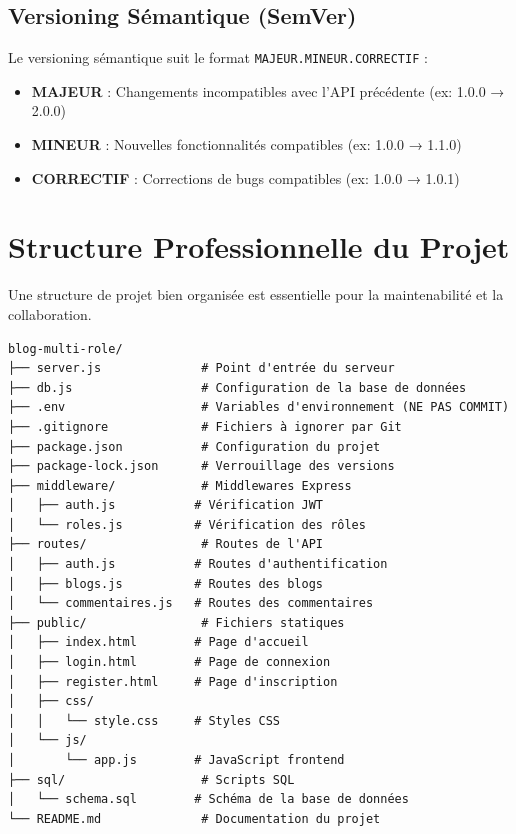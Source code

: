 \documentclass[a4paper,12pt]{book}
\begin{document}
\subsection{Versioning Sémantique (SemVer)}

Le versioning sémantique suit le format \texttt{MAJEUR.MINEUR.CORRECTIF} :

\begin{itemize}
    \item \textbf{MAJEUR} : Changements incompatibles avec l'API précédente (ex: 1.0.0 → 2.0.0)
    \item \textbf{MINEUR} : Nouvelles fonctionnalités compatibles (ex: 1.0.0 → 1.1.0)
    \item \textbf{CORRECTIF} : Corrections de bugs compatibles (ex: 1.0.0 → 1.0.1)
\end{itemize}

\section{Structure Professionnelle du Projet}

Une structure de projet bien organisée est essentielle pour la maintenabilité et la collaboration.

\begin{lstlisting}[style=bash, caption=Structure complète du projet]
blog-multi-role/
├── server.js              # Point d'entrée du serveur
├── db.js                  # Configuration de la base de données
├── .env                   # Variables d'environnement (NE PAS COMMIT)
├── .gitignore             # Fichiers à ignorer par Git
├── package.json           # Configuration du projet
├── package-lock.json      # Verrouillage des versions
├── middleware/            # Middlewares Express
│   ├── auth.js           # Vérification JWT
│   └── roles.js          # Vérification des rôles
├── routes/                # Routes de l'API
│   ├── auth.js           # Routes d'authentification
│   ├── blogs.js          # Routes des blogs
│   └── commentaires.js   # Routes des commentaires
├── public/                # Fichiers statiques
│   ├── index.html        # Page d'accueil
│   ├── login.html        # Page de connexion
│   ├── register.html     # Page d'inscription
│   ├── css/
│   │   └── style.css     # Styles CSS
│   └── js/
│       └── app.js        # JavaScript frontend
├── sql/                   # Scripts SQL
│   └── schema.sql        # Schéma de la base de données
└── README.md              # Documentation du projet
\end{lstlisting}
\end{document}

